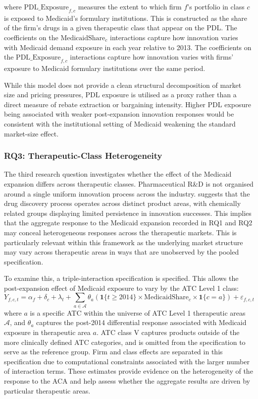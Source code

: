 \documentclass[12pt]{article}
\begin{document}
where $\text{PDL\_Exposure}_{f,c}$ measures the extent to which firm $f$'s portfolio in class $c$ is exposed to Medicaid's formulary institutions. This is constructed as the share of the firm's drugs in a given therapeutic class that appear on the PDL. The coefficients on the $\text{MedicaidShare}_c$ interactions capture how innovation varies with Medicaid demand exposure in each year relative to 2013. The coefficients on the $\text{PDL\_Exposure}_{f,c}$ interactions capture how innovation varies with firms' exposure to Medicaid formulary institutions over the same period.

While this model does not provide a clean structural decomposition of market size and pricing pressures, PDL exposure is utilised as a proxy rather than a direct measure of rebate extraction or bargaining intensity. Higher PDL exposure being associated with weaker post-expansion innovation responses would be consistent with the institutional setting of Medicaid weakening the standard market-size effect.

\subsubsection{RQ3: Therapeutic-Class Heterogeneity}

The third research question investigates whether the effect of the Medicaid expansion differs across therapeutic classes. Pharmaceutical R\&D is not organised around a single uniform innovation process across the industry. \citet{sutton1998technology} suggests that the drug discovery process operates across distinct product areas, with chemically related groups displaying limited persistence in innovation successes. This implies that the aggregate response to the Medicaid expansion recorded in RQ1 and RQ2 may conceal heterogeneous responses across the therapeutic markets. This is particularly relevant within this framework as the underlying market structure may vary across therapeutic areas in ways that are unobserved by the pooled specification.

To examine this, a triple-interaction specification is specified. This allows the post-expansion effect of Medicaid exposure to vary by the ATC Level 1 class:
\begin{equation}
Y_{f,c,t} = \alpha_f + \delta_c + \lambda_t +
\sum_{a \in \mathcal{A}} \theta_a \left(\mathbf{1}\{t \geq 2014\} \times \text{MedicaidShare}_c \times \mathbf{1}\{c = a\}\right) + \varepsilon_{f,c,t}
\end{equation}
where $a$ is a specific ATC within the universe of ATC Level 1 therapeutic areas $\mathcal{A}$, and $\theta_a$ captures the post-2014 differential response associated with Medicaid exposure in therapeutic area $a$. ATC class V captures products outside of the more clinically defined ATC categories, and is omitted from the specification to serve as the reference group. Firm and class effects are separated in this specification due to computational constraints associated with the larger number of interaction terms. These estimates provide evidence on the heterogeneity of the response to the ACA and help assess whether the aggregate results are driven by particular therapeutic areas.
\end{document}
